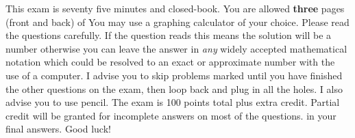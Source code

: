 \documentclass[12pt]{article}
\begin{document}
This exam is seventy five minutes and closed-book. You are allowed \textbf{three} pages (front and back) of  You may use a graphing calculator of your choice. Please read the questions carefully. If the question reads  this means the solution will be a number otherwise you can leave the answer in \textit{any} widely accepted mathematical notation which could be resolved to an exact or approximate number with the use of a computer. I advise you to skip problems marked  until you have finished the other questions on the exam, then loop back and plug in all the holes. I also advise you to use pencil. The exam is 100 points total plus extra credit. Partial credit will be granted for incomplete answers on most of the questions.  in your final answers. Good luck!

\pagebreak
\end{document}
